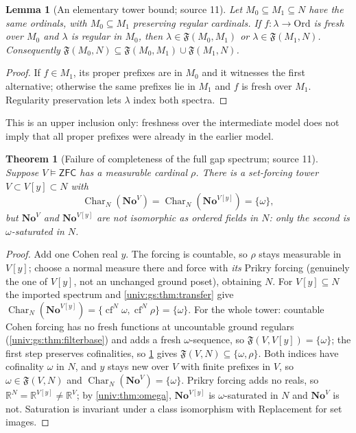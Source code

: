 \documentclass[11pt,letterpaper]{article}
\numberwithin{equation}{section}
\newtheorem{theorem}{Theorem}[section]
\newtheorem{lemma}[lemma]{Lemma}
\theoremstyle{definition}
\theoremstyle{remark}
\newcommand{\No}{\mathbf{No}}
\newcommand{\Ord}{\mathrm{Ord}}
\newcommand{\R}{\mathbb R}
\newcommand{\cf}{\operatorname{cf}}
\newcommand{\ZFC}{\mathsf{ZFC}}
\newcommand{\Char}{\operatorname{Char}}
\newcommand{\FF}{\mathfrak F}
\begin{document}
\begin{lemma}[An elementary tower bound; source 11]\label{univ:gs:lem:tower}
Let $M_0\subseteq M_1\subseteq N$ have the same ordinals, with $M_0\subseteq M_1$ preserving
regular cardinals. If $f:\lambda\to\Ord$ is fresh over $M_0$ and $\lambda$ is regular in $M_0$,
then $\lambda\in\FF(M_0,M_1)$ or $\lambda\in\FF(M_1,N)$. Consequently
$\FF(M_0,N)\subseteq\FF(M_0,M_1)\cup\FF(M_1,N)$.
\end{lemma}
\begin{proof}
If $f\in M_1$, its proper prefixes are in $M_0$ and it witnesses the first alternative;
otherwise the same prefixes lie in $M_1$ and $f$ is fresh over $M_1$. Regularity preservation
lets $\lambda$ index both spectra.
\end{proof}

This is an upper inclusion only: freshness over the intermediate model does not imply that all
proper prefixes were already in the earlier model.

\begin{theorem}[Failure of completeness of the full gap spectrum; source 11]\label{univ:gs:thm:incomplete}
Suppose $V\models\ZFC$ has a measurable cardinal $\rho$. There is a set-forcing tower
$V\subset V[y]\subset N$ with
\[
 \Char_N(\No^V)=\Char_N(\No^{V[y]})=\{\omega\},
\]
but $\No^V$ and $\No^{V[y]}$ are not isomorphic as ordered fields in $N$: only the second is
$\omega$-saturated in $N$.
\end{theorem}
\begin{proof}
Add one Cohen real $y$. The forcing is countable, so $\rho$ stays measurable in $V[y]$; choose
a normal measure there and force with \emph{its} Prikry forcing (genuinely the one of $V[y]$, not
an unchanged ground poset), obtaining $N$. For $V[y]\subseteq N$ the imported spectrum and
\cref{univ:gs:thm:transfer} give $\Char_N(\No^{V[y]})=\{\cf^N\omega,\cf^N\rho\}=\{\omega\}$. For
the whole tower: countable Cohen forcing has no fresh functions at uncountable ground regulars
(\cref{univ:gs:thm:filterbase}) and adds a fresh $\omega$-sequence, so $\FF(V,V[y])=\{\omega\}$;
the first step preserves cofinalities, so \cref{univ:gs:lem:tower} gives
$\FF(V,N)\subseteq\{\omega,\rho\}$. Both indices have cofinality $\omega$ in $N$, and $y$ stays new
over $V$ with finite prefixes in $V$, so $\omega\in\FF(V,N)$ and $\Char_N(\No^V)=\{\omega\}$.
Prikry forcing adds no reals, so $\R^N=\R^{V[y]}\ne\R^V$; by \cref{univ:thm:omega}, $\No^{V[y]}$ is
$\omega$-saturated in $N$ and $\No^V$ is not. Saturation is invariant under a class isomorphism with
Replacement for set images.
\end{proof}
\end{document}

